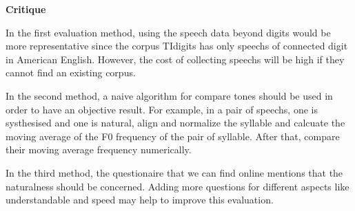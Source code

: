 \documentclass[12pt]{article}
\newenvironment{problem}[2][Problem]{\begin{trivlist}
\item[\hskip \labelsep {\bfseries #1}\hskip \labelsep {\bfseries #2.}]}{\end{trivlist}}
\begin{document}
\begin{problem}{5.3}
\noindent\textbf{Critique}

    In the first evaluation method, using the speech data beyond digits would 
    be more representative since the corpus TIdigits has only speechs of
    connected digit in American English. However, the cost of collecting speechs
    will be high if they cannot find an existing corpus.

    In the second method, a naive algorithm for compare tones should be used 
    in order to have an objective result. For example, in a pair of speechs, 
    one is systhesised and one is natural, align and normalize the syllable 
    and calcuate the  moving average of the F0 frequency of the pair of syllable.
    After that, compare their moving average frequency numerically.

    In the third method, the questionaire that we can find online  mentions 
    that the naturalness should be concerned. Adding more questions for different
    aspects like understandable and speed may help to improve this evaluation.
\end{problem}
\pagebreak



\end{document}
